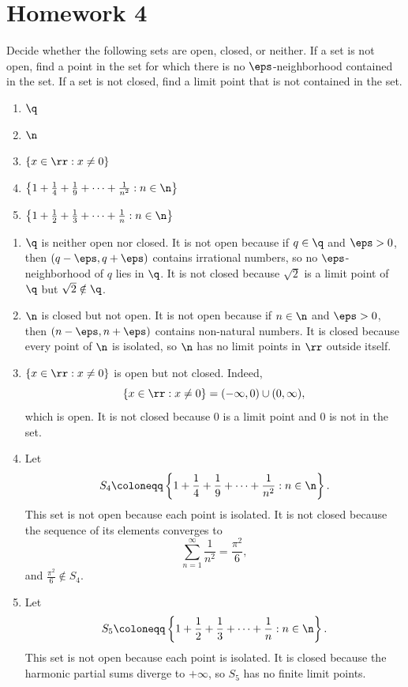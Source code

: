 
\section{Homework 4}

\begin{problem}{
    Decide whether the following sets are open, closed, or neither.
    If a set is not open, find a point in the set for which there is no $\eps$-neighborhood contained in the set.
    If a set is not closed, find a limit point that is not contained in the set.
    \begin{enumerate}[label={(\arabic*)}]
	\item $\q$
    \item $\n$
    \item $\{x\in\rr : x\neq 0\}$
    \item $\left\{1+\frac14+\frac19+\cdots+\frac1{n^2} : n\in\n\right\}$
    \item $\left\{1+\frac12+\frac13+\cdots+\frac1n : n\in\n\right\}$
    \end{enumerate}
}
    \begin{enumerate}[label={(\arabic*)}]
	\item $\q$ is neither open nor closed.
    It is not open because if $q\in\q$ and $\eps>0$, then $(q-\eps,q+\eps)$ contains irrational numbers, so no $\eps$-neighborhood of $q$ lies in $\q$.
    It is not closed because $\sqrt{2}$ is a limit point of $\q$ but $\sqrt{2}\notin\q$.

    \item $\n$ is closed but not open.
    It is not open because if $n\in\n$ and $\eps>0$, then $(n-\eps,n+\eps)$ contains non-natural numbers.
    It is closed because every point of $\n$ is isolated, so $\n$ has no limit points in $\rr$ outside itself.

    \item $\{x\in\rr : x\neq 0\}$ is open but not closed.
    Indeed,
    \[
        \{x\in\rr : x\neq 0\} = (-\infty,0)\cup(0,\infty),
    \]
    which is open.
    It is not closed because $0$ is a limit point and $0$ is not in the set.

    \item Let
    \[
        S_4 \coloneqq \left\{1+\frac14+\frac19+\cdots+\frac1{n^2} : n\in\n\right\}.
    \]
    This set is not open because each point is isolated.
    It is not closed because the sequence of its elements converges to
    \[
        \sum_{n=1}^\infty \frac1{n^2} = \frac{\pi^2}{6},
    \]
    and $\frac{\pi^2}{6}\notin S_4$.

    \item Let
    \[
        S_5 \coloneqq \left\{1+\frac12+\frac13+\cdots+\frac1n : n\in\n\right\}.
    \]
    This set is not open because each point is isolated.
    It is closed because the harmonic partial sums diverge to $+\infty$, so $S_5$ has no finite limit points.
    \end{enumerate}
\end{problem}

